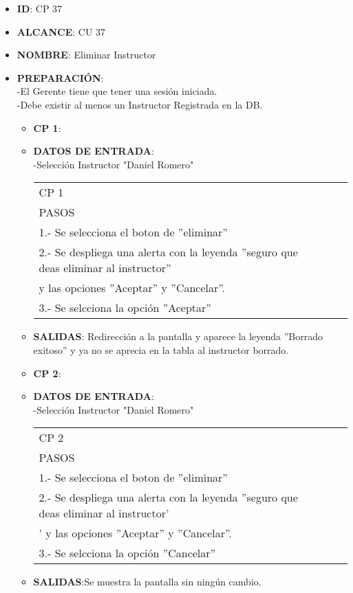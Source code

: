 \begin{itemize}
\item \textbf{ID}: CP 37
\item \textbf{ALCANCE}: CU 37
\item \textbf{NOMBRE}: Eliminar Instructor
\item \textbf{PREPARACIÓN}:\\
		-El Gerente tiene que tener una sesión iniciada.\\
		-Debe existir al menos un Instructor Registrada en la DB.
\begin{itemize}
\item \textbf{CP 1}:
\item \textbf{DATOS DE ENTRADA}:\\
-Selección Instructor "Daniel Romero"
	\begin{center}			
	\begin{tabular}{||l|l|l|l||}
		\hline
		\hline
			CP 1\\
			PASOS\\
			\hline 1.- Se selecciona el boton de ''eliminar''\\
			\hline 2.- Se despliega una alerta con la leyenda ''seguro que deas eliminar al instructor''\\ y las opciones ''Aceptar'' y ''Cancelar''.\\
			\hline 3.- Se selcciona la opción ''Aceptar''\\
        \hline
		\hline
	\end{tabular}
	\end{center}
\item \textbf{SALIDAS}: Redirección a la pantalla  y aparece la leyenda ''Borrado exitoso'' y ya no se aprecia en la tabla al instructor borrado.
\end{itemize}
\begin{itemize}
\item \textbf{CP 2}:
\item \textbf{DATOS DE ENTRADA}:\\
-Selección Instructor "Daniel Romero"
	\begin{center}			
	\begin{tabular}{||l|l|l|l||}
		\hline
		\hline
			CP 2\\
			PASOS\\
			\hline 1.- Se selecciona el boton de ''eliminar''\\
			\hline 2.- Se despliega una alerta con la leyenda ''seguro que deas eliminar al instructor'\\' y las opciones ''Aceptar'' y ''Cancelar''.\\
			\hline 3.- Se selcciona la opción ''Cancelar''\\
        \hline
		\hline
	\end{tabular}
	\end{center}
\item \textbf{SALIDAS}:Se muestra la pantalla  sin  ningún cambio.
\end{itemize}
\end{itemize}


